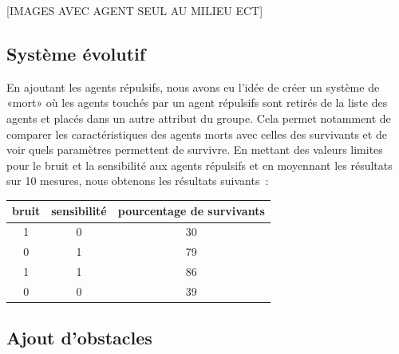 \documentclass[french, a4paper, 12pt, openany]{report}
\begin{document}
       [IMAGES AVEC AGENT SEUL AU MILIEU ECT]
       
       
   

	\subsection{Système évolutif}
	
		En ajoutant les agents répulsifs, nous avons eu l'idée de créer un système de «mort» où les agents touchés par un agent répulsifs sont retirés de la liste des agents et placés dans un autre attribut du groupe. Cela permet notamment de comparer les caractéristiques des agents morts avec celles des survivants et de voir quels paramètres permettent de survivre. En mettant des valeurs limites pour le bruit et la sensibilité aux agents répulsifs et en moyennant les résultats sur 10 mesures, nous obtenons les résultats suivants~:
		
		\begin{tabular}{|c|c|c|} \hline
			bruit & sensibilité & pourcentage de survivants \\ \hline
			1 & 0 & 30 \\ \hline
			0 & 1 & 79 \\ \hline
			1 & 1 & 86 \\ \hline
			0 & 0 & 39 \\ \hline
		\end{tabular}

\subsection{Ajout d'obstacles}
	
\end{document}
